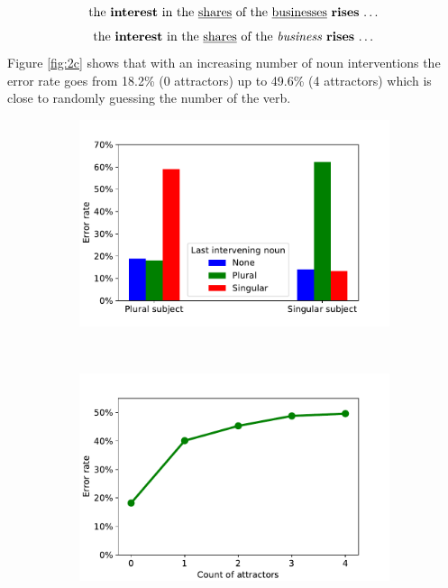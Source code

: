 \documentclass[twoside]{article}
\begin{document}
\begin{multicols}{2}
\begin{equation}
	\label{sent:right2}
	\textnormal{the \textbf{interest} in the \underline{shares} of the \underline{businesses} \textbf{rises} \dots}
\end{equation}
\begin{equation}
	\label{sent:wrong2}
	\textnormal{the \textbf{interest} in the \underline{shares} of the \textit{business} \textbf{rises} \dots}
\end{equation}
Figure \ref{fig:2c} shows that with an increasing number of noun interventions the error rate goes from 18.2\% (0 attractors) up to 49.6\% (4 attractors) which is close to randomly guessing the number of the verb. 
\end{multicols}

\begin{figure}
    \centering
    \begin{subfigure}[b]{0.4\textwidth}
    \caption{}
        \includegraphics[width=\textwidth]{2b.pdf}
        \label{fig:2b}
    \end{subfigure}
    ~ %
    \begin{subfigure}[b]{0.4\textwidth}
    	\caption{}
        \includegraphics[width=\textwidth]{2c.pdf}

\end{subfigure}
\end{figure}
\end{document}
